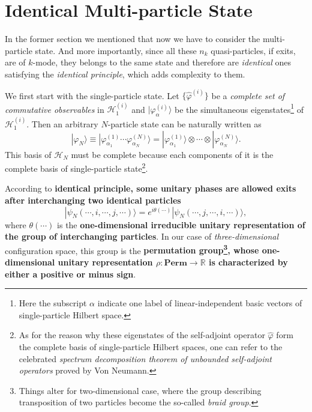 \documentclass[b5paper,10pt,UTF8]{book}
\numberwithin{equation}{section}
\begin{document}
	\section{Identical Multi-particle State}
		In the former section we mentioned that now we have to consider the multi-particle state. And more importantly, since all these $n_k$ quasi-particles, if exits, are of $k$-mode, they belongs to the same state and therefore are \emph{identical} ones satisfying the \emph{identical principle}, which adds complexity to them.\par
		We first start with the single-particle state. Let $\{\hat{\varphi}^{(i)}\}$ be a \emph{complete set of commutative observables} in $\mathcal{H}^{(i)}_1$ and $|\varphi_\alpha^{(i)}\rangle$ be the simultaneous eigenstates\footnote{Here the subscript $\alpha$ indicate one label of linear-independent basic vectors of single-particle Hilbert space.} of $\mathcal{H}^{(i)}_1$. Then an arbitrary $N$-particle state can be naturally written as
		\begin{equation}\label{1.4.0}
			|\varphi_N\rangle\equiv|\varphi_{\alpha_1}^{(1)}\cdots\varphi_{\alpha_N}^{(N)}\rangle=|\varphi_{\alpha_1}^{(1)}\rangle\otimes\cdots\otimes|\varphi_{\alpha_N}^{(N)}\rangle.
		\end{equation}
		This basis of $\mathcal{H}_{N}$ must be complete because each components of it is the complete basis of single-particle state\footnote{As for the reason why these eigenstates of the self-adjoint operator $\hat{\varphi}$ form the complete basis of single-particle Hilbert spaces, one can refer to the celebrated \emph{spectrum decomposition theorem of unbounded self-adjoint operators} proved by Von Neumann.}.\par
		According to \textbf{identical principle, some unitary phases are allowed exits after interchanging two identical particles}
		$$|\psi_N(\cdots,i,\cdots,j,\cdots)\rangle=e^{i\theta(\cdots)}|\psi_N(\cdots,j,\cdots,i,\cdots)\rangle,$$
		where $\theta(\cdots)$ is the \textbf{one-dimensional irreducible unitary representation of the group of interchanging particles}. In our case of \emph{three-dimensional} configuration space, this group is the \textbf{permutation group\footnote{Things alter for two-dimensional case, where the group describing transposition of two particles become the so-called \emph{braid group}.}, whose one-dimensional unitary representation $\rho:\mathbf{Perm}\rightarrow\mathbb{R}$ is characterized by either a positive or minus sign}. %
\end{document}
